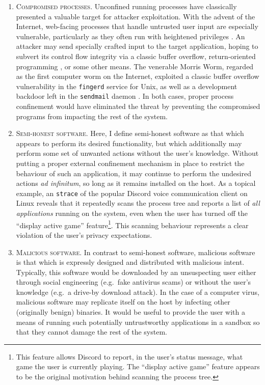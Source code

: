 \documentclass[dvipsnames, 12pt]{article}
\begin{document}
\begin{enumerate}[label=\bfseries A\arabic*., ref=A\arabic*, labelindent=2em]
    \item \label{a:1} \textsc{Compromised processes.} Unconfined running
    processes have classically presented a valuable target for attacker
    exploitation. With the advent of the Internet, web-facing processes that
    handle untrusted user input are especially vulnerable, particularly as they
    often run with heightened privileges \cite{cohen1996_secure}. An attacker
    may send specially crafted input to the target application, hoping to
    subvert its control flow integrity via a classic buffer overflow,
    return-oriented programming \cite{shacham2007_rop}, or some other means. The
    venerable Morris Worm, regarded as the first computer worm on the Internet,
    exploited a classic buffer overflow vulnerability in the \texttt{fingerd}
    service for Unix, as well as a development backdoor left in the
    \texttt{sendmail} daemon \cite{spafford1989_morris}. In both cases, proper
    process confinement would have eliminated the threat by preventing
    the compromised programs from impacting the rest of the system.

    \item \label{a:2} \textsc{Semi-honest software.} Here, I define semi-honest
    software as that which appears to perform its desired functionality, but
    which additionally may perform some set of unwanted actions without the
    user's knowledge. Without putting a proper external confinement mechanism in
    place to restrict the behaviour of such an application, it may continue to
    perform the undesired actions \textit{ad infinitum}, so long as it remains
    installed on the host. As a topical example, an \texttt{strace} of the
    popular Discord \cite{discord} voice communication client on Linux reveals
    that it repeatedly scans the process tree and reports a list of \textit{all
    applications} running on the system, even when the user has turned off the
    \enquote{display active game} feature\footnote{This feature allows Discord
    to report, in the user's status message, what game the user is currently
    playing. The \enquote{display active game} feature appears to be the
    original motivation behind scanning the process tree.}. This scanning
    behaviour represents a clear violation of the user's privacy expectations.

    \item \label{a:3} \textsc{Malicious software.} In contrast to semi-honest
    software, malicious software is that which is expressly designed and
    distributed with malicious intent. Typically, this software would be
    downloaded by an unsuspecting user either through social engineering
    (e.g.~fake antivirus scams) or without the user's knowledge (e.g.~a drive-by
    download attack). In the case of a computer virus, malicious software may
    replicate itself on the host by infecting other (originally benign) binaries.
    It would be useful to provide the user with a means of running such
    potentially untrustworthy applications in a sandbox so that they cannot
    damage the rest of the system.
\end{enumerate}
\end{document}
